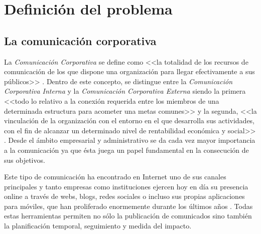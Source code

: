 \chapter{Definición del problema}

\section{La comunicación corporativa}
La \emph{Comunicación Corporativa} se define como <<la totalidad de los recursos de comunicación de los que dispone una organización para llegar efectivamente a sus públicos>> \cite{riel_2001}. Dentro de este concepto, se distingue entre la \emph{Comunicación Corporativa Interna} y la \emph{Comunicación Corporativa Externa} siendo la primera <<todo lo relativo a la conexión requerida entre los miembros de una determinada estructura para acometer una metas comunes>> y la segunda, <<la vinculación de la organización con el entorno en el que desarrolla sus actividades, con el fin de alcanzar un determinado nivel de rentabilidad económica y social>> \cite{castro_2007}. Desde el ámbito empresarial y administrativo se da cada vez mayor importancia a la comunicación ya que ésta juega un papel fundamental en la consecución de sus objetivos.

Este tipo de comunicación ha encontrado en Internet uno de sus canales principales y tanto empresas como instituciones ejercen hoy en día su presencia online a través de webs, blogs, redes sociales o incluso sus propias aplicaciones para móviles, que han proliferado enormemente durante los últimos años \cite{playstore} \cite{appstore}. Todas estas herramientas permiten no sólo la publicación de comunicados sino también la planificación temporal, seguimiento y medida del impacto.

